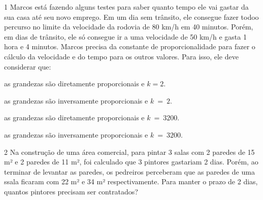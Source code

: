 \num{1} Marcos está fazendo alguns testes para saber quanto tempo ele vai
gastar da sua casa até seu novo emprego. Em um dia sem trânsito, ele
consegue fazer todoo percurso no limite da velocidade da rodovia de 80
km/h em 40 minutos. Porém, em dias de trânsito, ele só consegue ir a uma
velocidade de 50 km/h e gasta 1 hora e 4 minutos. Marcos precisa da
constante de proporcionalidade para fazer o cálculo da velocidade e do
tempo para os outros valores. Para isso, ele deve considerar que:

\begin{escolha}[itemsep=0pt]
\item as grandezas são diretamente proporcionais e $k  =  2$.
\item as grandezas são inversamente proporcionais e $k\  = \ 2$.
\item as grandezas são diretamente proporcionais e $k\  = \ 3200$.
\item as grandezas são inversamente proporcionais e $k\  = \ 3200$.
\end{escolha}



\num{2} Na construção de uma área comercial, para pintar 3 salas com 2
paredes de 15 m² e 2 paredes de 11 m², foi calculado que 3 pintores
gastariam 2 dias. Porém, ao terminar de levantar as paredes, os
pedreiros perceberam que as paredes de uma ssala ficaram com 22 m² e 34
m² respectivamente. Para manter o prazo de 2 dias, quantos pintores
precisam ser contratados?

